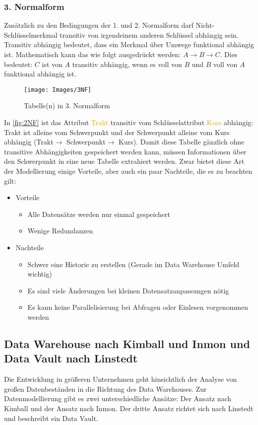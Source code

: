 \subsubsection*{3. Normalform}
Zusätzlich zu den Bedingungen der 1. und 2. Normalform darf Nicht-Schlüsselmerkmal transitiv von irgendeinem anderen Schlüssel abhängig sein. Transitiv abhängig bedeutet, dass ein Merkmal über Umwege funktional abhängig ist. Mathematisch kann das wie folgt ausgedrückt werden: $A\rightarrow B\rightarrow C$. Dies bedeutet: $C$ ist von $A$ transitiv abhängig, wenn es voll von $B$ und $B$ voll von $A$ funktional abhängig ist.
\begin{figure}[H]
	\begin{center}
		\texttt{[image: Images/3NF]}
		\caption{Tabelle(n) in 3. Normalform\cite{Knott:Normalformen}}
		\label{fig:3NF}
	\end{center}
\end{figure}
In \autoref{fig:2NF} ist das Attribut \colorbox[rgb]{.8,.8,.8}{\textcolor{orange}{Trakt}} transitiv vom Schlüsselattribut \colorbox[rgb]{.8,.8,.8}{\textcolor{orange}{Kurs}} abhängig: Trakt ist alleine vom Schwerpunkt und der Schwerpunkt alleine vom Kurs abhängig (Trakt$\rightarrow$ Schwerpunkt$\rightarrow$ Kurs).
Damit diese Tabelle gänzlich ohne transitive Abhängigkeiten gespeichert werden kann, müssen Informationen über den Schwerpunkt in eine neue Tabelle extrahiert werden.
\cite{Huckert:VL3}\cite{Knott:Normalformen}
Zwar bietet diese Art der Modellierung einige Vorteile, aber auch ein paar Nachteile, die es zu beachten gilt:
\begin{itemize}
	\item {Vorteile}
	\begin{itemize}
		\item Alle Datensätze werden nur einmal gespeichert
		\item Wenige Redundanzen
	\end{itemize}
	\item{Nachteile}
	\begin{itemize}
		\item Schwer eine Historie zu erstellen (Gerade im Data Warehouse Umfeld wichtig)
		\item Es sind viele Änderungen bei kleinen Datensatzanpassungen nötig
		\item Es kann keine Parallelisierung bei Abfragen oder Einlesen vorgenommen werden
	\end{itemize}
\end{itemize}
\subsection{Data Warehouse nach Kimball und Inmon und Data Vault nach Linstedt}
Die Entwicklung in größeren Unternehmen geht hinsichtlich der Analyse von großen Datenbeständen in die Richtung des Data Warehouses. Zur Datenmodellierung gibt es zwei unterschiedliche Ansätze: Der Ansatz nach Kimball und der Ansatz nach Inmon. Der dritte Ansatz richtet sich nach Linstedt und beschreibt ein Data Vault.

